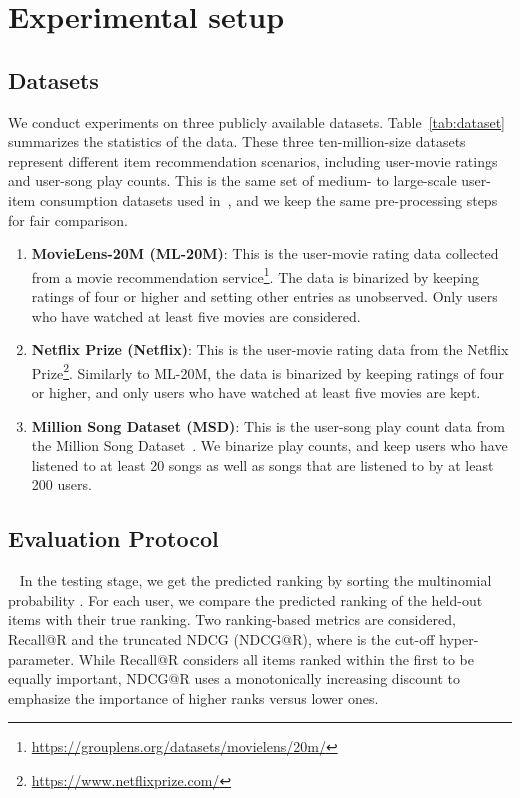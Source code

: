 \documentclass{article} \usepackage{iclr2020_conference,times}
\begin{document}
\section{Experimental setup} 

\subsection{Datasets}
We conduct experiments on three publicly available
datasets. Table~\ref{tab:dataset} summarizes the statistics of the data. These three ten-million-size datasets represent different item recommendation scenarios, including user-movie ratings and user-song play counts. This is the same set of medium- to large-scale user-item consumption datasets used in~\citet{liang2018variational}, and we keep the same pre-processing steps for fair comparison. 

\begin{enumerate}
\item {\bf MovieLens-20M (ML-20M)}: This is the user-movie rating data collected from a movie recommendation service\footnote{\url{https://grouplens.org/datasets/movielens/20m/}}. The data is binarized by keeping ratings of four or higher and setting other entries as unobserved. Only users who have watched at least
five movies are considered.
\item {\bf Netflix Prize (Netflix)}: This is the user-movie rating data from the Netflix Prize\footnote{\url{https://www.netflixprize.com/}}. Similarly to ML-20M, the data is binarized by keeping ratings of four or higher, and only users who have
watched at least five movies are kept.
\item {\bf Million Song Dataset (MSD)}: This is the user-song play count data from the Million Song Dataset~\citep{bertin2011million}. We
binarize play counts, and keep users who have listened to at least 20 songs as well as songs that are listened to by at least 200 users.
\end{enumerate}


\subsection{Evaluation Protocol}~\label{sec:evaluation_protocol}
In the testing stage, we get the predicted ranking by sorting the multinomial probability . For each user, we compare the predicted ranking of the held-out items with their true ranking. 
Two ranking-based metrics are considered, Recall@R and the truncated NDCG (NDCG@R), where  is the cut-off hyper-parameter.
While Recall@R considers all items ranked within the first  to be equally important, NDCG@R uses a monotonically increasing discount to emphasize the importance of higher ranks versus lower ones. 
\end{document}
